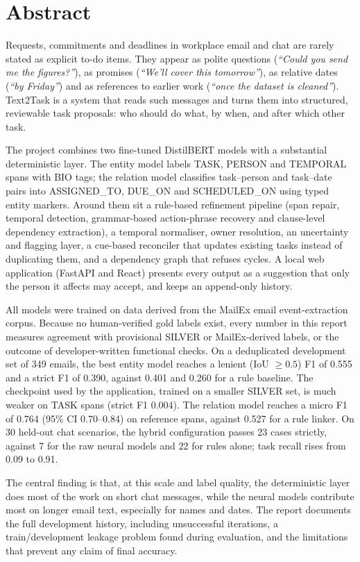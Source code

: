 \chapter*{Abstract}
Requests, commitments and deadlines in workplace email and chat are rarely stated as explicit to-do items. They appear as polite questions (\emph{``Could you send me the figures?''}), as promises (\emph{``We'll cover this tomorrow''}), as relative dates (\emph{``by Friday''}) and as references to earlier work (\emph{``once the dataset is cleaned''}). Text2Task is a system that reads such messages and turns them into structured, reviewable task proposals: who should do what, by when, and after which other task.

The project combines two fine-tuned DistilBERT models with a substantial deterministic layer. The entity model labels TASK, PERSON and TEMPORAL spans with BIO tags; the relation model classifies task--person and task--date pairs into ASSIGNED\_TO, DUE\_ON and SCHEDULED\_ON using typed entity markers. Around them sit a rule-based refinement pipeline (span repair, temporal detection, grammar-based action-phrase recovery and clause-level dependency extraction), a temporal normaliser, owner resolution, an uncertainty and flagging layer, a cue-based reconciler that updates existing tasks instead of duplicating them, and a dependency graph that refuses cycles. A local web application (FastAPI and React) presents every output as a suggestion that only the person it affects may accept, and keeps an append-only history.

All models were trained on data derived from the MailEx email event-extraction corpus. Because no human-verified gold labels exist, every number in this report measures agreement with provisional SILVER or MailEx-derived labels, or the outcome of developer-written functional checks. On a deduplicated development set of 349 emails, the best entity model reaches a lenient (IoU $\ge 0.5$) F1 of 0.555 and a strict F1 of 0.390, against 0.401 and 0.260 for a rule baseline. The checkpoint used by the application, trained on a smaller SILVER set, is much weaker on TASK spans (strict F1 0.004). The relation model reaches a micro F1 of 0.764 (95\% CI 0.70--0.84) on reference spans, against 0.527 for a rule linker. On 30 held-out chat scenarios, the hybrid configuration passes 23 cases strictly, against 7 for the raw neural models and 22 for rules alone; task recall rises from 0.09 to 0.91.

The central finding is that, at this scale and label quality, the deterministic layer does most of the work on short chat messages, while the neural models contribute most on longer email text, especially for names and dates. The report documents the full development history, including unsuccessful iterations, a train/development leakage problem found during evaluation, and the limitations that prevent any claim of final accuracy.
